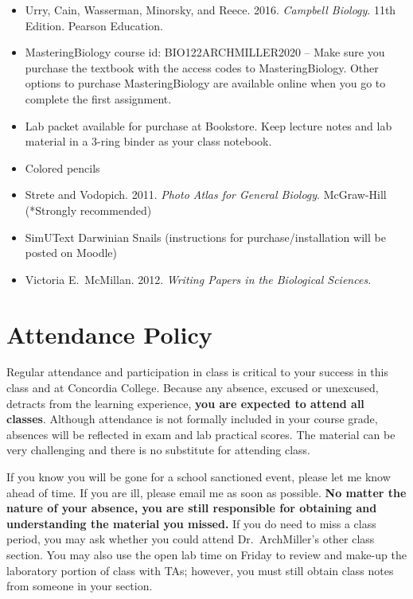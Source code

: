 \documentclass{tufte-handout}
\begin{document}
\begin{fullwidth}
\begin{itemize}
	\item Urry, Cain, Wasserman, Minorsky, and Reece. 2016. \emph{Campbell Biology}. 11th Edition. Pearson Education.
	\item MasteringBiology course id: BIO122ARCHMILLER2020 -- Make sure you purchase the textbook with the access codes to MasteringBiology. Other options to purchase MasteringBiology are available online when you go to complete the first assignment. 
	\item Lab packet available for purchase at Bookstore. Keep lecture notes and lab material in a 3-ring binder as your class notebook. 
	\item Colored pencils
	\item Strete and Vodopich. 2011. \emph{Photo Atlas for General Biology}. McGraw-Hill (*Strongly recommended)
	\item SimUText Darwinian Snails (instructions for purchase/installation will be posted on Moodle)
	\item Victoria E.\ McMillan. 2012. \emph{Writing Papers in the Biological Sciences}.
\end{itemize}

\section{Attendance Policy}

Regular attendance and participation in class is critical to your success in this class and at Concordia College. Because any absence, excused or unexcused, detracts from the learning experience, \textbf{you are expected to attend all classes}. Although attendance is not formally included in your course grade, absences will be reflected in exam and lab practical scores. The material can be very challenging and there is no substitute for attending class. 




If you know you will be gone for a school sanctioned event, please let me know ahead of time. If you are ill, please email me as soon as possible. \textbf{No matter the nature of your absence, you are still responsible for obtaining and understanding the material you missed.} If you do need to miss a class period, you may ask whether you could attend Dr.\ ArchMiller's other class section. You may also use the open lab time on Friday to review and make-up the laboratory portion of class with TAs; however, you must still obtain class notes from someone in your section.  


\end{fullwidth}
\end{document}
